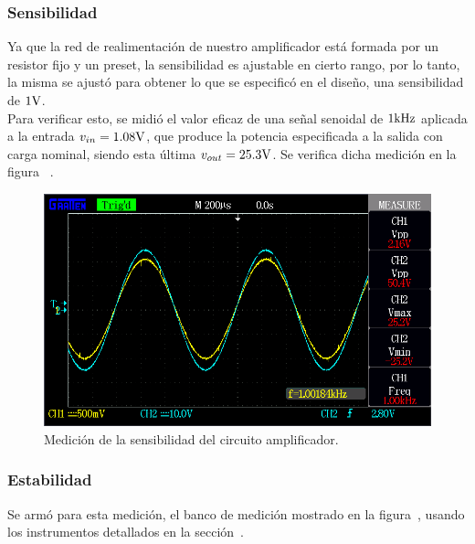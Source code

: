 \vfill

\clearpage



\subsubsection{Sensibilidad}

Ya que la red de realimentación de nuestro amplificador está formada por un resistor fijo y un preset, la sensibilidad es ajustable en cierto rango, por lo tanto, la misma se ajustó para obtener lo que se especificó en el diseño, una sensibilidad de $1 \si[per-mode=symbol]{\volt}$. \\
Para verificar esto, se midió el valor eficaz de una señal senoidal de $1 \si[per-mode=symbol]{\kilo\hertz}$ aplicada a la entrada $v_{in}=1.08 \si[per-mode=symbol]{\volt}$, que produce la potencia especificada a la salida con carga nominal, siendo esta última $v_{out}= 25.3 \si[per-mode=symbol]{\volt}$. Se verifica dicha medición en la figura ~.

\begin{figure}[H]
    \centering
    \includegraphics[width=0.95 \textwidth]{./img/mediciones/Sensitivity/1.png}
    \caption{Medición de la sensibilidad del circuito amplificador.}
    \label{fig:Sensitivity}
\end{figure}

\clearpage




\subsubsection{Estabilidad}

Se armó para esta medición, el banco de medición mostrado en la figura~, usando los instrumentos detallados en la sección~.


